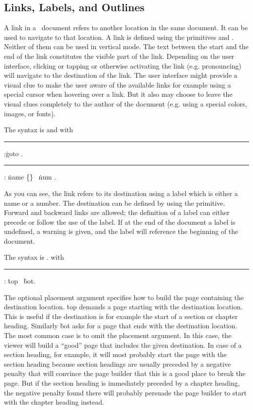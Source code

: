\subsection{Links, Labels, and Outlines}\label{llo}
A link in a \HINT\ document refers to another location in the same document.
It can be used to navigate to that location.
A link is defined using the primitives 
and .
Neither of them can be used in vertical mode.
The text between the start and the end of the link
constitutes the visible part of the link. Depending on the user interface, clicking
or tapping or otherwise activating the link (e.g. pronouncing)
will navigate to the destination of the link.
The user interface might provide a visual clue to make the user aware of the
available links for example using a special cursor when hovering over a link.
But it also may choose to leave the visual clues completely to the author
of the document (e.g. using a special colors, images, or fonts).

The syntax is 
  
and
with

\medskip
\rule {}:\.{goto} .
\rule {}:
  \.{name} \.{\{}\.{\}} \OR\ \.{num} .
\medskip

As you can see, the link refers to its destination using a label
which is either a name or a number.
The destination can be defined by using the 
 primitive.
Forward and backward links are allowed; the definition of a label can either
precede or follow the use of the label. If at the end of the document a label
is undefined, a warning is given, and the label will reference the beginning of the
document.

The syntax is
\medskip
\prim{}  .
\medskip
with
\medskip
\rule{}:
\.{top} \OR\ \.{bot}.
\medskip

The optional placement argument specifies how to build the page 
containing the destination location. \.{top} demands
a page starting with the destination location. This is useful
if the destination is for example the start of a section or chapter heading.
Similarly \.{bot} asks for a page that ends with the destination location.
The most common case is to omit the placement argument. In this case, the
viewer will build a ``good'' page that includes the given destination.
In case of a section heading, for example, it will most probably start the
page with the section heading because section headings are usually preceded
by a negative penalty that will convince the page builder that this is a good
place to break the page. But if the section heading is immediately preceded
by a chapter heading, the negative penalty found there will probably
persuade the page builder to start with the chapter heading instead.

